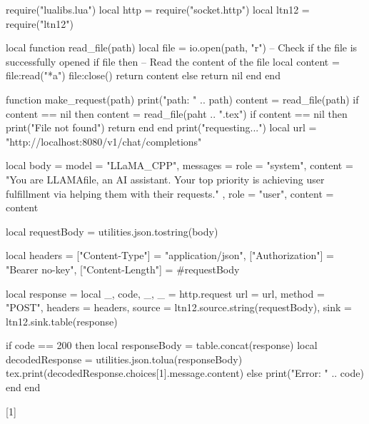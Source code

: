 

\usepackage{luacode}


\begin{luacode}
require("lualibs.lua")
local http = require("socket.http")
local ltn12 = require("ltn12")

local function read_file(path)
    local file = io.open(path, "r")
    -- Check if the file is successfully opened
    if file then
        -- Read the content of the file
        local content = file:read("*a")
        file:close()
        return content
    else
        return nil
    end
end


function make_request(path)
    print("path: " .. path)
  content = read_file(path)
  if content == nil then
    content = read_file(paht .. ".tex")
    if content == nil then
      print("File not found")
      return
    end
  end
  print("requesting...")
  local url = "http://localhost:8080/v1/chat/completions"

  local body = {
    model = "LLaMA_CPP",
    messages = {
      { role = "system", content = "You are LLAMAfile, an AI assistant. Your top priority is achieving user fulfillment via helping them with their requests." },
      { role = "user",   content = content }
    }
  }

  local requestBody = utilities.json.tostring(body)

  local headers = {
    ["Content-Type"] = "application/json",
    ["Authorization"] = "Bearer no-key",
    ["Content-Length"] = #requestBody
  }

  local response = {}
  local _, code, _, _ = http.request {
    url = url,
    method = "POST",
    headers = headers,
    source = ltn12.source.string(requestBody),
    sink = ltn12.sink.table(response)
  }

  if code == 200 then
    local responseBody = table.concat(response)
    local decodedResponse = utilities.json.tolua(responseBody)
    tex.print(decodedResponse.choices[1].message.content)
  else
    print("Error: " .. code)
  end
end
\end{luacode}

\let\originalinput

\renewcommand{}[1]{%
}
